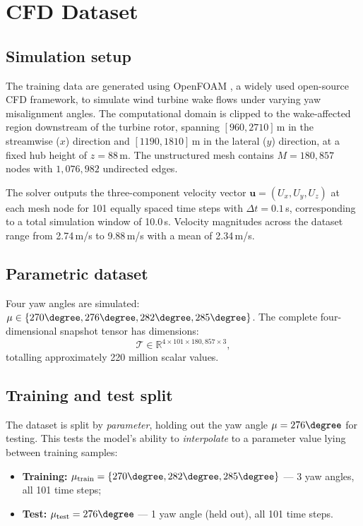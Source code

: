 \documentclass[12pt]{article}
\newcommand{\R}{\mathbb{R}}
\newcommand{\tensor}[1]{\boldsymbol{\mathcal{#1}}}
\newcommand{\vect}[1]{\mathbf{#1}}
\newcommand{\dt}{\Delta t}
\begin{document}
\section{CFD Dataset}
\label{sec:data}

\subsection{Simulation setup}

The training data are generated using OpenFOAM \citep{OpenFOAM}, a widely used open-source CFD framework, to simulate wind turbine wake flows under varying yaw misalignment angles.
The computational domain is clipped to the wake-affected region downstream of the turbine rotor, spanning $[960, 2710]$\,m in the streamwise ($x$) direction and $[1190, 1810]$\,m in the lateral ($y$) direction, at a fixed hub height of $z = 88$\,m.
The unstructured mesh contains $M = 180{,}857$ nodes with $1{,}076{,}982$ undirected edges.

The solver outputs the three-component velocity vector $\vect{u} = (U_x, U_y, U_z)$ at each mesh node for 101 equally spaced time steps with $\dt = 0.1$\,s, corresponding to a total simulation window of 10.0\,s.
Velocity magnitudes across the dataset range from 2.74\,m/s to 9.88\,m/s with a mean of 2.34\,m/s.

\subsection{Parametric dataset}

Four yaw angles are simulated: $\mu \in \{270\degree, 276\degree, 282\degree, 285\degree\}$.
The complete four-dimensional snapshot tensor has dimensions:
\begin{equation}
    \tensor{T} \in \R^{4 \times 101 \times 180{,}857 \times 3},
\end{equation}
totalling approximately 220 million scalar values.

\subsection{Training and test split}

The dataset is split by \emph{parameter}, holding out the yaw angle $\mu = 276\degree$ for testing.
This tests the model's ability to \emph{interpolate} to a parameter value lying between training samples:
\begin{itemize}
    \item \textbf{Training:} $\mu_{\text{train}} = \{270\degree, 282\degree, 285\degree\}$ --- 3 yaw angles, all 101 time steps;
    \item \textbf{Test:} $\mu_{\text{test}} = 276\degree$ --- 1 yaw angle (held out), all 101 time steps.
\end{itemize}
\end{document}
